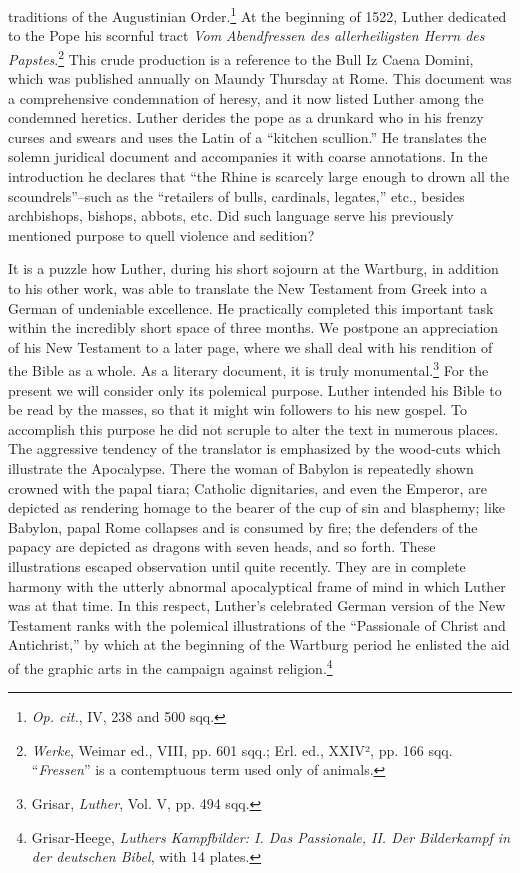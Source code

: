 traditions of the Augustinian Order.\footnote{\textit{Op. cit.}, IV, 238 and 500 sqq.}
At the beginning of 1522, Luther dedicated to the Pope his scornful tract
\textit{Vom Abendfressen des allerheiligsten Herrn des Papstes}.\footnote
{\textit{Werke}, Weimar ed., VIII, pp. 601 sqq.; Erl. ed., XXIV², pp. 166 sqq. “\textit{Fressen}” is a
contemptuous term used only of animals.}
This crude production is a reference to the Bull Iz Caena Domini,
which was published annually on Maundy Thursday at Rome. This
document was a comprehensive condemnation of heresy, and it now
listed Luther among the condemned heretics. Luther derides the
pope as a drunkard who in his frenzy curses and swears and uses the
Latin of a “kitchen scullion.” He translates the solemn juridical document
and accompanies it with coarse annotations. In the introduction
he declares that “the Rhine is scarcely large enough to drown all
the scoundrels”--such as the “retailers of bulls, cardinals, legates,”
etc., besides archbishops, bishops, abbots, etc. Did such language serve
his previously mentioned purpose to quell violence and sedition?

It is a puzzle how Luther, during his short sojourn at the Wartburg, in
addition to his other work, was able to translate the New
Testament from Greek into a German of undeniable excellence. He
practically completed this important task within the incredibly short
space of three months. We postpone an appreciation of his New Testament
to a later page, where we shall deal with his rendition of the
Bible as a whole. As a literary document, it is truly monumental.\footnote{Grisar, \textit{Luther}, Vol. V, pp. 494 sqq.}
For the present we will consider only its polemical purpose. Luther
intended his Bible to be read by the masses, so that it might win followers
to his new gospel. To accomplish this purpose he did not
scruple to alter the text in numerous places. The aggressive tendency
of the translator is emphasized by the wood-cuts which illustrate
the Apocalypse. There the woman of Babylon is repeatedly shown
crowned with the papal tiara; Catholic dignitaries, and even the Emperor,
are depicted as rendering homage to the bearer of the cup of
sin and blasphemy; like Babylon, papal Rome collapses and is consumed by
fire; the defenders of the papacy are depicted as dragons with
seven heads, and so forth. These illustrations escaped observation until
quite recently. They are in complete harmony with the utterly abnormal
apocalyptical frame of mind in which Luther was at that
time. In this respect, Luther’s celebrated German version of the New
Testament ranks with the polemical illustrations of the “Passionale
of Christ and Antichrist,” by which at the beginning of the Wartburg period
he enlisted the aid of the graphic arts in the campaign
against religion.\footnote
{Grisar-Heege, \textit{Luthers Kampfbilder: I. Das Passionale, II. Der Bilderkampf in der
deutschen Bibel}, with 14 plates.}


